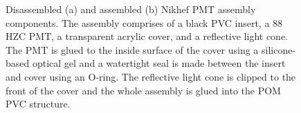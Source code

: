 \begin{figure} %
    \centering
    \quad
    \caption[Disassembled and assembled Nikhef PMT housing components]
    {Disassembled (a) and assembled (b) Nikhef PMT assembly components. The assembly comprises of
        a black PVC insert, a \unit{88}{} HZC PMT, a transparent acrylic cover, and a
        reflective light cone. The PMT is glued to the inside surface of the cover using a
        silicone-based optical gel and a watertight seal is made between the insert and cover
        using an O-ring. The reflective light cone is clipped to the front of the cover and the
        whole assembly is glued into the POM PVC structure.}
    \label{fig:nikhef_pmt_assembly}
\end{figure}


